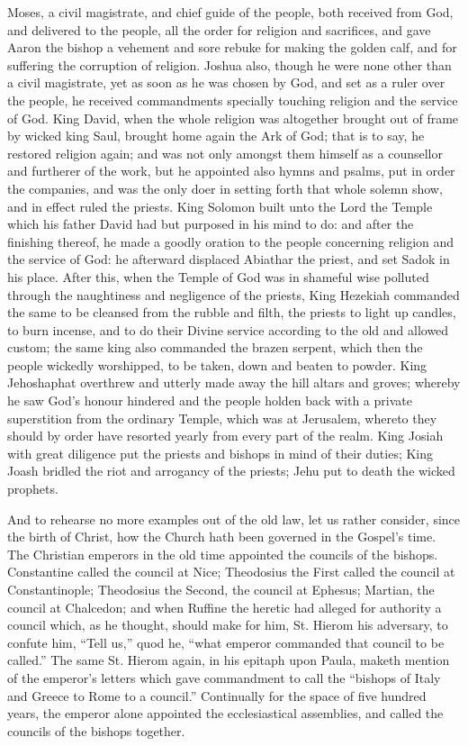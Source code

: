Moses, a civil magistrate, and chief guide of the people, both received
from God, and delivered to the people, all the order for religion and
sacrifices, and gave Aaron the bishop a vehement and sore rebuke for
making the golden calf, and for suffering the corruption of religion.
Joshua also, though he were
none other than a civil magistrate, yet as soon as he was chosen by
God, and set as a ruler over the people, he received commandments specially
touching religion and the service of God. King David, when the
whole religion was altogether brought out of frame by wicked king Saul,
brought home again the Ark of God; that is to say, he restored religion
again; and was not only amongst them himself as a counsellor and furtherer
of the work, but he appointed also hymns and psalms, put in order the
companies, and was the only doer in setting forth that whole solemn
show, and in effect ruled the priests. King Solomon built unto
the Lord the Temple which his father David had but purposed in his mind
to do: and after the finishing thereof, he made a goodly oration to
the people concerning religion and the service of God: he afterward
displaced Abiathar the priest, and set Sadok in his place. After
this, when the Temple of God was in shameful wise polluted through the
naughtiness and negligence of the priests, King Hezekiah commanded the
same to be cleansed from the rubble and filth, the priests to light
up candles, to burn incense, and to do their Divine service according
to the old and allowed custom; the same king also commanded the brazen
serpent, which then
the people wickedly worshipped, to be taken, down and beaten to powder.
King Jehoshaphat overthrew and utterly made away the hill altars and
groves; whereby he saw God’s honour hindered and the people holden
back with a private superstition from the ordinary Temple, which was
at Jerusalem, whereto they should by order have resorted yearly from
every part of the realm. King Josiah with great diligence put
the priests and bishops in mind of their duties; King Joash bridled
the riot and arrogancy of the priests; Jehu put to death the wicked
prophets.

And to rehearse no more examples out of the old law, let us rather
consider, since the birth of Christ, how the Church hath been governed
in the Gospel’s time. The Christian emperors in the old
time appointed the councils of the bishops. Constantine called
the council at Nice; Theodosius the First called the council at Constantinople;
Theodosius the Second, the council at Ephesus; Martian, the council
at Chalcedon; and when Ruffine the heretic had alleged for authority
a council which, as he thought, should make for him, St. Hierom his
adversary, to confute him, “Tell us,” quod he, “what
emperor commanded that council to be called.” The same St.
Hierom again, in his epitaph
upon Paula, maketh mention of the emperor’s letters which gave
commandment to call the “bishops of Italy and Greece to Rome to
a council.” Continually for the space of five hundred years,
the emperor alone appointed the ecclesiastical assemblies, and called
the councils of the bishops together.

